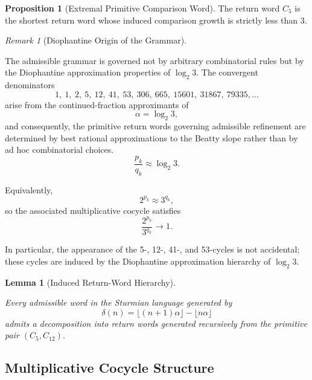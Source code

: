 \documentclass[12pt, oneside]{article}
\numberwithin{equation}{section}
\theoremstyle{definition}
\newtheorem{proposition}{Proposition}[section]
\theoremstyle{plain}
\newtheorem{lemma}[theorem]{Lemma}
\theoremstyle{remark}
\newtheorem*{remark}{Remark}
\begin{document}
\begin{proposition}[Extremal Primitive Comparison Word]
\label{prop:extremal-comparison-word}
The return word \(C_5\) is the shortest return word whose induced
comparison growth is strictly less than \(3\).
\end{proposition}

\begin{remark}[Diophantine Origin of the Grammar]
\label{rem:diophantine-grammar}

The admissible grammar is governed not by arbitrary combinatorial rules but by the Diophantine
approximation properties of \(\log_2 3\).  The convergent denominators
\[
1,\ 1,\ 2,\ 5,\ 12,\ 41,\ 53,\ 306,\ 665,\ 15601,\ 31867,\ 79335,\ldots
\]
arise from the continued-fraction approximants of
\[
\alpha=\log_2 3,
\]
and consequently, the primitive return words governing admissible refinement are
determined by best rational approximations to the Beatty slope rather than by
ad hoc combinatorial choices.
\[
\frac{p_k}{q_k}\approx \log_2 3.
\]

Equivalently,
\[
2^{p_k}\approx 3^{q_k},
\]
so the associated multiplicative cocycle satisfies
\[
\frac{2^{p_k}}{3^{q_k}}\to1.
\]


In particular, the appearance of the 5-, 12-, 41-, and 53-cycles
is not accidental; these cycles are induced by the Diophantine
approximation hierarchy of $\log_2 3$.
\end{remark}

\begin{lemma}[Induced Return-Word Hierarchy]
\label{lem:induced-hierarchy}

Every admissible word in the Sturmian language generated by
\[
\delta(n) = \lfloor (n+1)\alpha\rfloor-\lfloor n\alpha\rfloor
\]
admits a decomposition into return words generated
recursively from the primitive pair $(C_5, C_{12})$.
\end{lemma}

\noindent


\subsection{Multiplicative Cocycle Structure}
\end{document}
